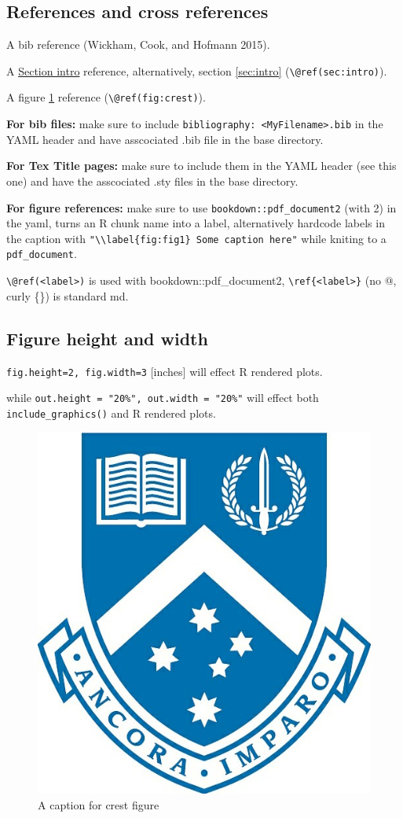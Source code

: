 \documentclass[11,]{article}
\begin{document}
\hypertarget{references-and-cross-references}{%
\subsection{References and cross references}\label{references-and-cross-references}}

A bib reference (Wickham, Cook, and Hofmann 2015).

A \protect\hyperlink{sec:intro}{Section intro} reference, alternatively, section \ref{sec:intro} (\texttt{\textbackslash{}@ref(sec:intro)}).

A figure \ref{fig:crest} reference (\texttt{\textbackslash{}@ref(fig:crest)}).

\textbf{For bib files:} make sure to include \texttt{bibliography:\ \textless{}MyFilename\textgreater{}.bib} in the YAML header and have asscociated .bib file in the base directory.

\textbf{For Tex Title pages:} make sure to include them in the YAML header (see this one) and have the asscociated .sty files in the base directory.

\textbf{For figure references:} make sure to use \texttt{bookdown::pdf\_document2} (with 2) in the yaml, turns an R chunk name into a label, alternatively hardcode labels in the caption with \texttt{"\textbackslash{}\textbackslash{}label\{fig:fig1\}\ Some\ caption\ here"} while kniting to a \texttt{pdf\_document}.

\texttt{\textbackslash{}@ref(\textless{}label\textgreater{})} is used with bookdown::pdf\_document2, \texttt{\textbackslash{}ref\{\textless{}label\textgreater{}\}} (no @, curly \{\}) is standard md.

\hypertarget{sec2:subsection}{%
\subsection{Figure height and width}\label{sec2:subsection}}

\texttt{fig.height=2,\ fig.width=3} {[}inches{]} will effect R rendered plots.

while \texttt{out.height\ =\ "20\%",\ out.width\ =\ "20\%"} will effect both \texttt{include\_graphics()} and R rendered plots.

\begin{figure}

{\centering \includegraphics[width=0.2\linewidth,height=0.2\textheight]{figures/can_con/crest} 

}

\caption{A caption for crest figure}\label{fig:crest}
\end{figure}
\end{document}
